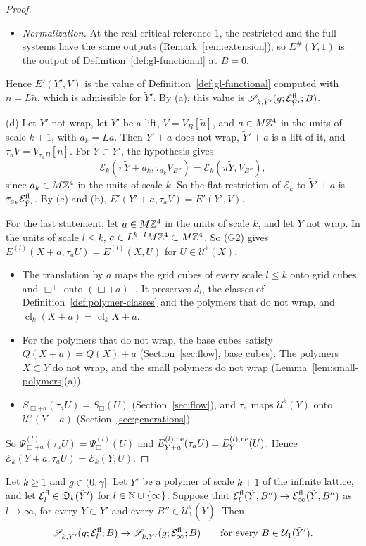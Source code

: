 \begin{proof}
\begin{itemize}
\item \emph{Normalization.} At the real critical reference $1$, the restricted and the full systems have the same outputs (Remark~\ref{rem:extension}), so $E^\#(Y,1)$ is the output of Definition~\ref{def:gl-functional} at $B=0$.
\end{itemize}
Hence $E'(Y',V)$ is the value of Definition~\ref{def:gl-functional} computed with $n=L\tilde n$, which is admissible for $\tilde Y'$. By (a), this value is $\mathscr S_{k,\tilde Y'}(g;\mathcal E^{\rm fl}_{\tilde Y'};B)$.

(d) Let $Y'$ not wrap, let $\tilde Y'$ be a lift, $V=V_B[\tilde n]$, and $a\in M\mathbb Z^4$ in the units of scale $k+1$, with $a_k=La$. Then $Y'+a$ does not wrap, $\tilde Y'+a$ is a lift of it, and $\tau_aV=V_{\tau_aB}[\tilde n]$. For $\tilde Y\subset\tilde Y'$, the hypothesis gives
\[
\mathcal E_k(\pi\tilde Y+a_k,\tau_{a_k}V_{B''})=\mathcal E_k(\pi\tilde Y,V_{B''}),
\]
since $a_k\in M\mathbb Z^4$ in the units of scale $k$. So the flat restriction of $\mathcal E_k$ to $\tilde Y'+a$ is $\tau_{a_k}\mathcal E^{\rm fl}_{\tilde Y'}$. By (c) and (b), $E'(Y'+a,\tau_aV)=E'(Y',V)$.

For the last statement, let $a\in M\mathbb Z^4$ in the units of scale $k$, and let $Y$ not wrap. In the units of scale $l\le k$, $a\in L^{k-l}M\mathbb Z^4\subset M\mathbb Z^4$. So (G2) gives $E^{(l)}(X+a,\tau_aU)=E^{(l)}(X,U)$ for $U\in\mathcal U^\flat(X)$.
\begin{itemize}
\item The translation by $a$ maps the grid cubes of every scale $l\le k$ onto grid cubes and $\Box^+$ onto $(\Box+a)^+$. It preserves $d_l$, the classes of Definition~\ref{def:polymer-classes} and the polymers that do not wrap, and $\operatorname{cl}_k(X+a)=\operatorname{cl}_kX+a$.
\item For the polymers that do not wrap, the base cubes satisfy $Q(X+a)=Q(X)+a$ (Section~\ref{sec:flow}, base cubes). The polymers $X\subset Y$ do not wrap, and the small polymers do not wrap (Lemma~\ref{lem:small-polymers}(a)).
\item $S_{\Box+a}(\tau_aU)=S_\Box(U)$ (Section~\ref{sec:flow}), and $\tau_a$ maps $\mathcal U^\flat(Y)$ onto $\mathcal U^\flat(Y+a)$ (Section~\ref{sec:generations}).
\end{itemize}
So $\Psi^{(l)}_{\Box+a}(\tau_aU)=\Psi^{(l)}_\Box(U)$ and $E^{(l),\rm ne}_{Y+a}(\tau_aU)=E^{(l),\rm ne}_Y(U)$. Hence $\mathcal E_k(Y+a,\tau_aU)=\mathcal E_k(Y,U)$.
\end{proof}

\begin{lemma}\label{lem:gl-continuity}
Let $k\ge1$ and $g\in(0,\gamma]$. Let $\tilde Y'$ be a polymer of scale $k+1$ of the infinite lattice, and let $\mathcal E^{\rm fl}_l\in\mathfrak D_k(\tilde Y')$ for $l\in\mathbb N\cup\{\infty\}$. Suppose that $\mathcal E^{\rm fl}_l(\tilde Y,B'')\to\mathcal E^{\rm fl}_\infty(\tilde Y,B'')$ as $l\to\infty$, for every $\tilde Y\subset\tilde Y'$ and every $B''\in\mathcal U^\flat_1(\tilde Y)$. Then
\[
\mathscr S_{k,\tilde Y'}(g;\mathcal E^{\rm fl}_l;B)\to\mathscr S_{k,\tilde Y'}(g;\mathcal E^{\rm fl}_\infty;B)\qquad\text{for every }B\in\mathcal U_1(\tilde Y').
\]
\end{lemma}

